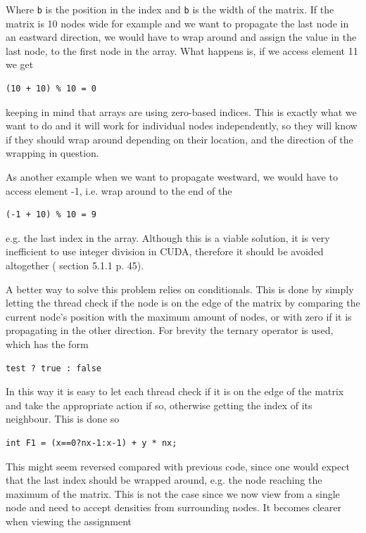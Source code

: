 Where \texttt{b} is the position in the index and \texttt{b} is the width of the matrix. If the matrix is 10 nodes wide for example and we want to propagate the last node in an eastward direction, we would have to wrap around and assign the value in the last node, to the first node in the array. What happens is, if we access element 11 we get

\begin{verbatim}
(10 + 10) % 10 = 0
\end{verbatim}

keeping in mind that arrays are using zero-based indices. This is exactly what we want to do and it will work for individual nodes independently, so they will know if they should wrap around depending on their location, and the direction of the wrapping in question. 

As another example when we want to propagate westward, we would have to access element -1, i.e. wrap around to the end of the 

\begin{verbatim}
(-1 + 10) % 10 = 9
\end{verbatim}

e.g. the last index in the array. Although this is a viable solution, it is very inefficient to use integer division in CUDA, therefore it should be avoided altogether (\cite{bestpracticesguide} section 5.1.1 p. 45).

A better way to solve this problem relies on conditionals. This is done by simply letting the thread check if the node is on the edge of the matrix by comparing the current node's position with the maximum amount of nodes, or with zero if it is propagating in the other direction. For brevity the ternary operator is used, which has the form

\begin{verbatim}
test ? true : false
\end{verbatim}

In this way it is easy to let each thread check if it is on the edge of the matrix and take the appropriate action if so, otherwise getting the index of its neighbour. This is done so

\begin{verbatim}
int F1 = (x==0?nx-1:x-1) + y * nx;
\end{verbatim}

This might seem reversed compared with previous code, since one would expect that the last index should be wrapped around, e.g. the node reaching the maximum of the matrix. This is not the case since we now view from a single node and need to accept densities from surrounding nodes. It becomes clearer when viewing the assignment

